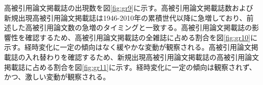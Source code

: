 高被引用論文掲載誌の出現数を図\ref{fig:gr9}に示す。高被引用論文掲載誌数および新規出現高被引用論文掲載誌は1946-2010年の累積世代以降に急増しており、前述した高被引用論文数の急増のタイミングと一致する。高被引用論文掲載誌の影響性を確認するため、高被引用論文掲載誌の全雑誌に占める割合を図\ref{fig:gr10}に示す。経時変化に一定の傾向はなく緩やかな変動が観察される。高被引用論文掲載誌の入れ替わりを確認するため、新規出現高被引用論文掲載誌の高被引用論文掲載誌に占める割合を図\ref{fig:gr11}に示す。経時変化に一定の傾向は観察されず、かつ、激しい変動が観察される。
